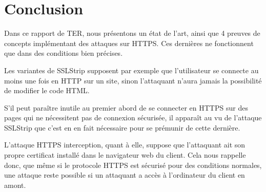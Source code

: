 \chapter*{Conclusion}


Dans ce rapport de TER, nous présentons un état de l'art, ainsi que 4 preuves de concepts implémentant des attaques sur HTTPS. Ces dernières ne fonctionnent que dans des conditions bien précises.

Les variantes de SSLStrip supposent par exemple que l'utilisateur se connecte au moins une fois en HTTP sur un site, sinon l'attaquant n'aura jamais la possibilité de modifier le code HTML.

S'il peut paraître inutile au premier abord de se connecter en HTTPS sur des pages qui ne nécessitent pas de connexion sécurisée, il apparaît au vu de l'attaque SSLStrip que c'est en en fait nécessaire pour se prémunir de cette dernière.

L'attaque HTTPS interception, quant à elle, suppose que l'attaquant ait son propre certificat installé dans le navigateur web du client. Cela nous rappelle donc, que même si le protocole HTTPS est sécurisé pour des conditions normales, une attaque reste possible si un attaquant a accès à l'ordinateur du client en amont.
